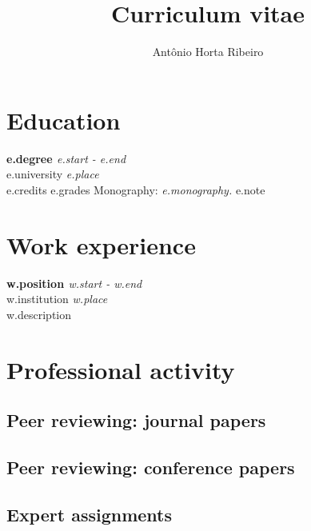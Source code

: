 \documentclass[10pt,letterpaper]{article} %
\title{Curriculum vitae}
\author{Antônio Horta Ribeiro}
\begin{document}
\maketitle

\section*{Education} %

{%
    {\bf {{ e.degree }} } \hfill {\em  {{ e.start }} -   {{ e.end }}  } \\
    {{ e.university }}  \hfill {\em {{ e.place}} } \\
    {{ e.credits }} {{ e.grades }}
    Monography: {\em {{ e.monography}}. } {{e.note}}
{%


\section*{Work experience} %

{%
    {\bf {{ w.position }} } \hfill {\em  {{ w.start }} -   {{ w.end }}  } \\
    {{ w.institution }} \hfill {\em  {{ w.place }}} \\
    {{ w.description }}
{%

\section*{Professional activity}

\subsection*{Peer reviewing: journal papers}

{%

\subsection*{Peer reviewing: conference papers}

{%

\subsection*{Expert assignments}

}}}}}}
\end{document}
